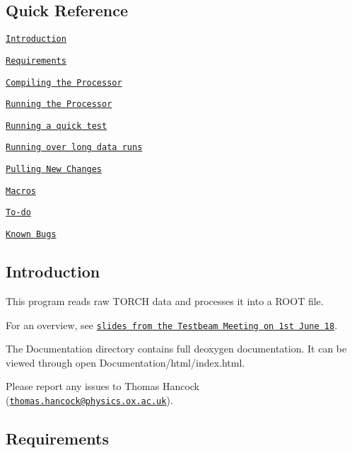 \subsection*{Quick Reference}


\begin{DoxyEnumerate}
\item \href{#Introduction}{\tt Introduction}
\item \href{#Requirements}{\tt Requirements}
\item \href{#Compiling}{\tt Compiling the Processor}
\item \href{#Running}{\tt Running the Processor}
\begin{DoxyEnumerate}
\item \href{#RunQuickTest}{\tt Running a quick test}
\item \href{#RunLongRuns}{\tt Running over long data runs}
\end{DoxyEnumerate}
\item \href{#Pulling}{\tt Pulling New Changes}
\item \href{#Macros}{\tt Macros}
\item \href{#ToDo}{\tt To-\/do}
\item \href{#KnownBugs}{\tt Known Bugs}
\end{DoxyEnumerate}

\subsection*{Introduction \label{_Introduction}%
}

This program reads raw T\+O\+R\+CH data and processes it into a R\+O\+OT file.

For an overview, see \href{https://indico.cern.ch/event/731827/contributions/3026751/attachments/1660291/2659581/Multiboard_Data_Processor.pdf}{\tt slides from the Testbeam Meeting on 1st June 18}.

The {\ttfamily Documentation} directory contains full deoxygen documentation. It can be viewed through {\ttfamily open Documentation/html/index.\+html}.

Please report any issues to Thomas Hancock (\href{mailto:thomas.hancock@physics.ox.ac.uk}{\tt thomas.\+hancock@physics.\+ox.\+ac.\+uk}).

\subsection*{Requirements \label{_Requirements}%
}

